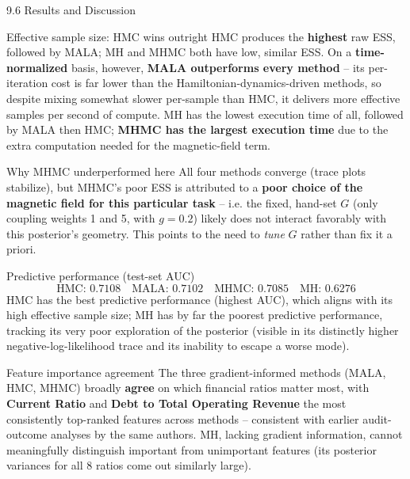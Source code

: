 \documentclass[aspectratio=169,10pt]{beamer}
\begin{document}
\begin{frame}[allowframebreaks]{9.6 Results and Discussion}

\begin{block}{Effective sample size: HMC wins outright}
HMC produces the \textbf{highest} raw ESS, followed by MALA; MH and MHMC
both have low, similar ESS. On a \textbf{time-normalized} basis, however,
\textbf{MALA outperforms every method} -- its per-iteration cost is far
lower than the Hamiltonian-dynamics-driven methods, so despite mixing
somewhat slower per-sample than HMC, it delivers more effective samples per
second of compute. MH has the lowest execution time of all, followed by
MALA then HMC; \textbf{MHMC has the largest execution time} due to the
extra computation needed for the magnetic-field term.
\end{block}

\begin{block}{Why MHMC underperformed here}
All four methods converge (trace plots stabilize), but MHMC's poor ESS is
attributed to a \textbf{poor choice of the magnetic field for this
particular task} -- i.e. the fixed, hand-set $G$ (only coupling weights 1
and 5, with $g=0.2$) likely does not interact favorably with this
posterior's geometry. This points to the need to \emph{tune} $G$ rather
than fix it a priori.
\end{block}

\framebreak

\begin{block}{Predictive performance (test-set AUC)}
$$ \text{HMC: } 0.7108 \quad \text{MALA: } 0.7102 \quad
   \text{MHMC: } 0.7085 \quad \text{MH: } 0.6276 $$
HMC has the best predictive performance (highest AUC), which aligns with
its high effective sample size; MH has by far the poorest predictive
performance, tracking its very poor exploration of the posterior (visible
in its distinctly higher negative-log-likelihood trace and its inability
to escape a worse mode).
\end{block}

\begin{block}{Feature importance agreement}
The three gradient-informed methods (MALA, HMC, MHMC) broadly \textbf{agree}
on which financial ratios matter most, with \textbf{Current Ratio} and
\textbf{Debt to Total Operating Revenue} the most consistently top-ranked
features across methods -- consistent with earlier audit-outcome analyses
by the same authors. MH, lacking gradient information, cannot meaningfully
distinguish important from unimportant features (its posterior variances
for all 8 ratios come out similarly large).
\end{block}

\end{frame}
\end{document}
